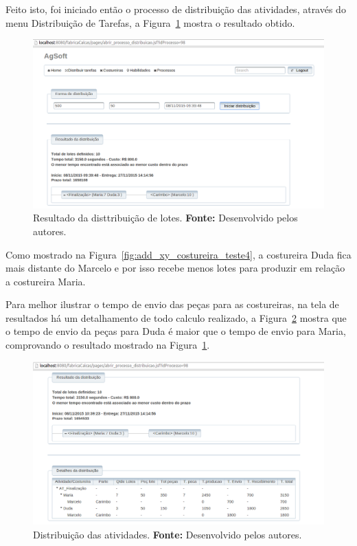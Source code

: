 \par Feito isto, foi iniciado então o processo de distribuição das atividades,
através do menu Distribuição de Tarefas, a Figura~\ref{fig:resultado_transporte_teste4} mostra o resultado obtido.


\begin{figure}[h!]
	\centerline{\includegraphics[scale=0.3]{./imagens/resultado_transporte_teste4.png}}
	\caption[Resultado da disttribuição de lotes.]
	{Resultado da disttribuição de lotes. \textbf{Fonte:} Desenvolvido pelos
	autores.}
	\label{fig:resultado_transporte_teste4}
\end{figure}

\par Como mostrado na Figura~\ref{fig:add_xy_costureira_teste4}, a costureira
Duda fica mais distante do Marcelo e por isso recebe menos lotes para produzir em
relação a costureira Maria.

\par Para melhor ilustrar o tempo de envio das peças para as costureiras, na tela
de resultados há um detalhamento de todo calculo realizado, a Figura~\ref{fig:detalhameneto_transporte_teste4} 
mostra que o tempo de envio da peças para Duda é 
maior que o tempo de envio para Maria, comprovando o resultado mostrado na
Figura~\ref{fig:resultado_transporte_teste4}.

\begin{figure}[h!]
	\centerline{\includegraphics[scale=0.3]{./imagens/detalhamento_transporte_teste4.png}}
	\caption[Distribuição das atividades.] 
	{Distribuição das atividades. \textbf{Fonte:} Desenvolvido pelos autores.}
	\label{fig:detalhameneto_transporte_teste4}
\end{figure}

